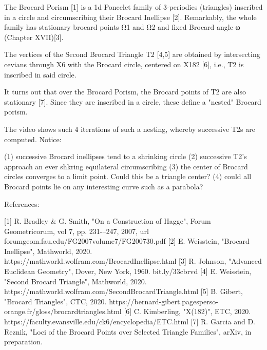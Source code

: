 The Brocard Porism [1] is a 1d Poncelet family of 3-periodics (triangles) inscribed in a circle and circumscribing their Brocard Inellipse [2]. Remarkably, the whole family has stationary brocard points Ω1 and Ω2 and fixed Brocard angle ω (Chapter XVII)[3].

The vertices of the Second Brocard Triangle T2 [4,5] are obtained by intersecting cevians through X6 with the Brocard circle, centered on X182 [6], i.e., T2 is inscribed in said circle.

It turns out that over the Brocard Porism, the Brocard points of T2 are also stationary [7]. Since they are inscribed in a circle, these define a "nested" Brocard porism.

The video shows such 4 iterations of such a nesting, whereby successive T2s are computed. Notice:

(1) successive Brocard inellipses tend to a shrinking circle
(2) successive T2's approach an ever shkring equilateral circumscribing
(3) the center of Brocard circles converges to a limit point. Could this be a triangle center?  
(4) could all Brocard points lie on any interesting curve such as a parabola?

References:
 
[1] R. Bradley & G. Smith, "On a Construction of Hagge", Forum Geometricorum, vol 7, pp. 231-–247, 2007, url forumgeom.fau.edu/FG2007volume7/FG200730.pdf
[2] E. Weisstein, "Brocard Inellipse", Mathworld, 2020. https://mathworld.wolfram.com/BrocardInellipse.html
[3] R. Johnson, "Advanced Euclidean Geometry", Dover, New York, 1960. bit.ly/33cbrvd
[4] E. Weisstein, "Second Brocard Triangle", Mathworld, 2020. https://mathworld.wolfram.com/SecondBrocardTriangle.html
[5] B. Gibert, "Brocard Triangles", CTC, 2020. https://bernard-gibert.pagesperso-orange.fr/gloss/brocardtriangles.html
[6] C. Kimberling, "X(182)", ETC, 2020. https://faculty.evansville.edu/ck6/encyclopedia/ETC.html
[7] R. Garcia and D. Reznik, "Loci of the Brocard Points over Selected Triangle Families", arXiv, in preparation.